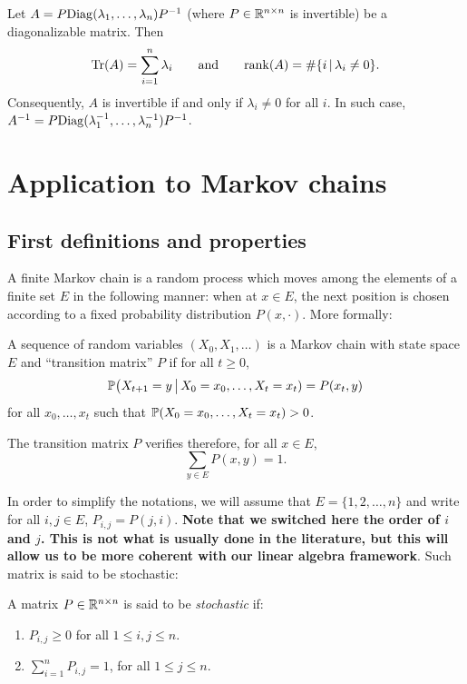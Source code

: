 \documentclass[11pt,nocut]{article}
\begin{document}
\begin{proposition}
	Let $A = P \Diag(\lambda_1,\dots,\lambda_n) P^{-1}$ (where $P \in \R^{n \times n}$ is invertible) be a diagonalizable matrix. Then
$$
\Tr(A) = \sum_{i=1}^n \lambda_i
\qquad \text{and} \qquad
\rank(A) = \# \{ i \, | \, \lambda_i \neq 0 \}.
$$
Consequently, $A$ is invertible if and only if $\lambda_i \neq 0$ for all $i$. In such case, $A^{-1} = P \Diag(\lambda_1^{-1}, \dots, \lambda_n^{-1}) P^{-1}$.
\end{proposition}

\section{Application to Markov chains}

\subsection{First definitions and properties}

A finite Markov chain is a random process which moves among the elements of a finite set $E$ in the following manner: when at $x \in E$, the next position is chosen according to a fixed probability distribution $P(x, \cdot)$. More formally:

\begin{definition}
	A sequence of random variables $(X_0, X_1, \dots)$ is a Markov chain with state space $E$ and ``transition matrix'' $P$ if for all $t \geq 0$, 
	$$
	\P\big( X_{t+1} = y \, \big| \, X_0= x_0, \dots, X_t = x_t ) = P(x_t,y)
	$$
	for all $x_0, \dots, x_t$ such that $\P(X_0 = x_0, \dots, X_t = x_t) >0$.
\end{definition}

The transition matrix $P$ verifies therefore, for all $x \in E$,
\begin{equation}
	\sum_{y \in E} P(x,y) = 1.
\end{equation}

In order to simplify the notations, we will assume that $E = \{1,2, \dots, n\}$ and write for all $i,j \in E$, $P_{i,j} = P(j,i)$. 
\textbf{Note that we switched here the order of $i$ and $j$. This is not what is usually done in the literature, but this will allow us to be more coherent with our linear algebra framework}.
Such matrix is said to be stochastic:

\begin{definition}
	A matrix $P \in \R^{n \times n}$ is said to be \emph{stochastic} if:
	\begin{enumerate}[label=(\roman*),noitemsep]
		\item $P_{i,j} \geq 0$ for all $1 \leq i,j \leq n$.
		\item $\sum\limits_{i=1}^n P_{i,j} = 1$, for all $1 \leq j \leq n$.
	\end{enumerate}
\end{definition}
\end{document}
